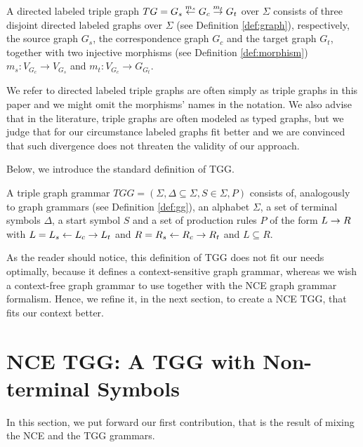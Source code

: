 \documentclass[runningheads]{llncs}
\begin{document}
\begin{definition}
	A directed labeled triple graph $TG = G_s \overset{m_s}{\leftarrow} G_c \overset{m_t}{\rightarrow} G_t$ over $\Sigma$ consists of three disjoint directed labeled graphs over $\Sigma$ (see Definition \ref{def:graph}), respectively, the source graph $G_s$, the correspondence graph $G_c$ and the target graph $G_t$, together with two injective morphisms (see Definition \ref{def:morphism}) $m_s: V_{G_c} \to V_{G_s}$ and $m_t : V_{G_c} \to G_{G_t}$.
\end{definition}

We refer to directed labeled triple graphs are often simply as triple graphs in this paper and we might omit the morphisms' names in the notation. We also advise that in the literature, triple graphs are often modeled as typed graphs, but we judge that for our circumstance labeled graphs fit better and we are convinced that such divergence does not threaten the validity of our approach.


Below, we introduce the standard definition of TGG.

\begin{definition}
	\label{def:stgg}
	A triple graph grammar $TGG = (\Sigma, \Delta \subseteq \Sigma, S \in \Sigma, P)$ consists of, analogously to graph grammars (see Definition \ref{def:gg}), an alphabet $\Sigma$, a set of terminal symbols $\Delta$, a start symbol $S$ and a set of production rules $P$ of the form $L \to R$ with $L = L_s \overset{}{\leftarrow} L_c \overset{}{\rightarrow} L_t$ and $R = R_s \overset{}{\leftarrow} R_c \overset{}{\rightarrow} R_t$ and $L \subseteq R$.
\end{definition}

As the reader should notice, this definition of TGG does not fit our needs optimally, because it defines a context-sensitive graph grammar, whereas we wish a context-free graph grammar to use together with the NCE graph grammar formalism. Hence, we refine it, in the next section, to create a NCE TGG, that fits our context better.

\section{NCE TGG: A TGG with Non-terminal Symbols}
\label{sec:bncetgg}
In this section, we put forward our first contribution, that is the result of mixing the NCE and the TGG grammars.
\end{document}
